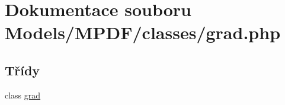 \hypertarget{grad_8php}{\section{Dokumentace souboru Models/\-M\-P\-D\-F/classes/grad.php}
\label{grad_8php}
}
\subsection*{Třídy}
\begin{DoxyCompactItemize}
\item 
class \hyperlink{classgrad}{grad}
\end{DoxyCompactItemize}
